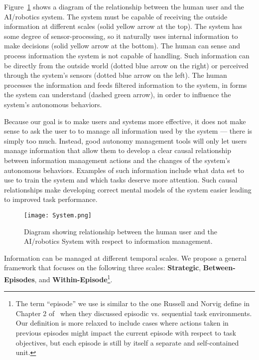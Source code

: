 Figure~\ref{system} shows a diagram of the relationship between the human user and the AI/robotics system. The system must be capable of receiving the outside information at different scales (solid yellow arrow at the top). The system has some degree of sensor-processing, so it naturally uses internal information to make decisions (solid yellow arrow at the bottom). The human can sense and process information the system is not capable of handling. Such information can be directly from the outside world (dotted blue arrow on the right) or perceived through the system's sensors (dotted blue arrow on the left). The human processes the information and feeds filtered information to the system, in forms the system can understand (dashed green arrow), in order to influence the system's autonomous behaviors.

Because our goal is to make users and systems more effective, it does not make sense to ask the user to to manage all information used by the system --- there is simply too much. Instead, good autonomy management tools will only let users manage information that allow them to develop a clear causal relationship between information management actions and the changes of the system's autonomous behaviors. Examples of such information include what data set to use to train the system and which tasks deserve more attention. Such causal relationships make developing correct mental models of the system easier leading to improved task performance. 

\begin{figure}
\centering
\texttt{[image: System.png]}
\caption{Diagram showing relationship between the human user and the AI/robotics System with respect to information management.}
\label{system}
\end{figure}

Information can be managed at different temporal scales. 
We propose a general framework that focuses on the following three scales: \textbf{Strategic}, \textbf{Between-Episodes}, and \textbf{Within-Episode}\footnote{The term ``episode'' we use is similar to the one Russell and Norvig define in Chapter 2 of~\cite{Russell2009Artificial} when they discussed episodic vs. sequential task environments. Our definition is more relaxed to include cases where actions taken in previous episodes might impact the current episode with respect to task objectives, but each episode is still by itself a separate and self-contained unit.}. 

